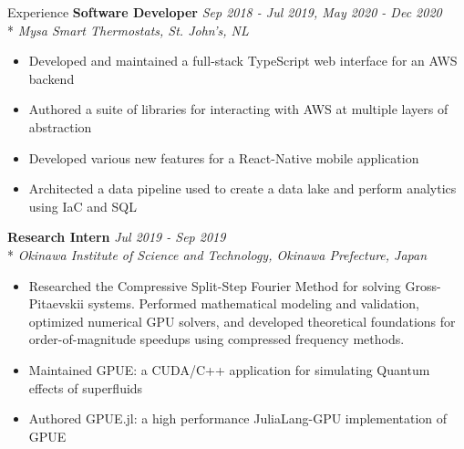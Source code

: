 \documentclass[11pt, letterpaper]{article}
\begin{document}
\begin{section}{Experience}
\textbf{Software Developer}
\hfill
\textit{Sep 2018 - Jul 2019, May 2020 - Dec 2020}\\*
\textit{Mysa Smart Thermostats, St. John's, NL}
\begin{itemize}
  \item Developed and maintained a full-stack TypeScript web interface for an AWS backend
  \item Authored a suite of libraries for interacting with AWS at multiple layers of abstraction
  \item Developed various new features for a React-Native mobile application
  \item Architected a data pipeline used to create a data lake and perform analytics using IaC and SQL \\
\end{itemize}

\textbf{Research Intern}
\hfill
\textit{Jul 2019 - Sep 2019}\\*
\textit{Okinawa Institute of Science and Technology, Okinawa Prefecture, Japan}
\begin{itemize}
  \item Researched the Compressive Split-Step Fourier Method for solving Gross-Pitaevskii systems.
  Performed mathematical modeling and validation, optimized numerical GPU solvers, and developed theoretical foundations for order-of-magnitude speedups using compressed frequency methods.
  \item Maintained GPUE: a CUDA/C++ application for simulating Quantum effects of superfluids
  \item Authored GPUE.jl: a high performance JuliaLang-GPU implementation of GPUE
\end{itemize}

\end{section}

\pagebreak
\end{document}
